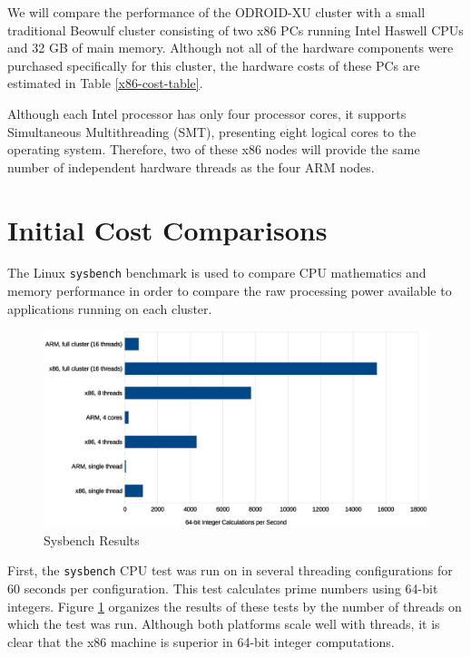 \documentclass[11pt]{book}
\begin{document}
We will compare the performance of the ODROID-XU cluster with a small traditional Beowulf
cluster consisting of two x86 PCs running Intel Haswell CPUs and 32 GB of main memory.
Although not all of the hardware components were purchased specifically for this cluster,
the hardware costs of these PCs are estimated in Table \ref{x86-cost-table}.

Although each Intel processor has only four processor cores, it supports Simultaneous
Multithreading (SMT), presenting eight logical cores to the operating system.  Therefore,
two of these x86 nodes will provide the same number of independent hardware threads as the
four ARM nodes.

\section{Initial Cost Comparisons}

The Linux \verb;sysbench; benchmark is used to compare CPU mathematics and memory
performance in order to compare the raw processing power available to applications running
on each cluster.

\begin{figure}
\centering
\includegraphics[width=\textwidth]{sysbench_all}
\caption{Sysbench Results}
\label{sysbench-all}
\end{figure}

First, the \verb;sysbench; CPU test was run on in several threading configurations for 60
seconds per configuration.  This test calculates prime numbers using 64-bit
integers.  Figure \ref{sysbench-all} organizes the results of these tests by the number of
threads on which the test was run. Although both platforms scale well with threads, it is
clear that the x86 machine is superior in 64-bit integer computations.
\end{document}
